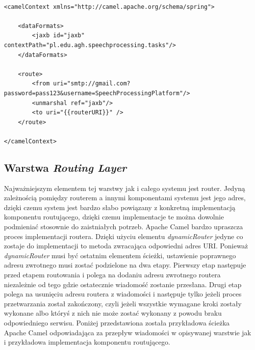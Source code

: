 \begin{center}
\begin{lstlisting}

<camelContext xmlns="http://camel.apache.org/schema/spring">

	<dataFormats>
		<jaxb id="jaxb" contextPath="pl.edu.agh.speechprocessing.tasks"/>
	</dataFormats>

	<route>
		<from uri="smtp://gmail.com?password=pass123&username=SpeechProcessingPlatform"/>
		<unmarshal ref="jaxb"/>
		<to uri="{{routerURI}}" />
	</route>

</camelContext>
\end{lstlisting}
\end{center}


\subsection{Warstwa \textit{Routing Layer}}

Najważniejszym elementem tej warstwy jak i całego systemu jest router. Jedyną zależnością pomiędzy routerem a innymi komponentami systemu jest jego adres, dzięki czemu system jest bardzo słabo powiązany z konkretną implementacją komponentu routującego, dzięki czemu implementacje te można dowolnie podmieniać stosownie do zaistniałych potrzeb. Apache Camel bardzo upraszcza proces implementacji routera. Dzięki użyciu elementu \textit{dynamicRouter} jedyne co zostaje do implementacji to metoda zwracająca odpowiedni adres URI. Ponieważ \textit{dynamicRouter} musi być ostatnim elementem ścieżki, ustawienie poprawnego adresu zwrotnego musi zostać podzielone na dwa etapy. Pierwszy etap następuje przed etapem routowania i polega na dodaniu adresu zwrotnego routera niezależnie od tego gdzie ostatecznie wiadomość zostanie przesłana. Drugi etap polega na usunięciu adresu routera z wiadomości i następuje tylko jeżeli proces przetwarzania został zakończony, czyli jeżeli wszystkie wymagane kroki zostały wykonane albo któryś z nich nie może zostać wykonany z powodu braku odpowiedniego serwisu. Poniżej przedstawiona została przykładowa ścieżka Apache Camel odpowiadająca za przepływ wiadomości w opisywanej warstwie jak i przykładowa implementacja komponentu routującego.


